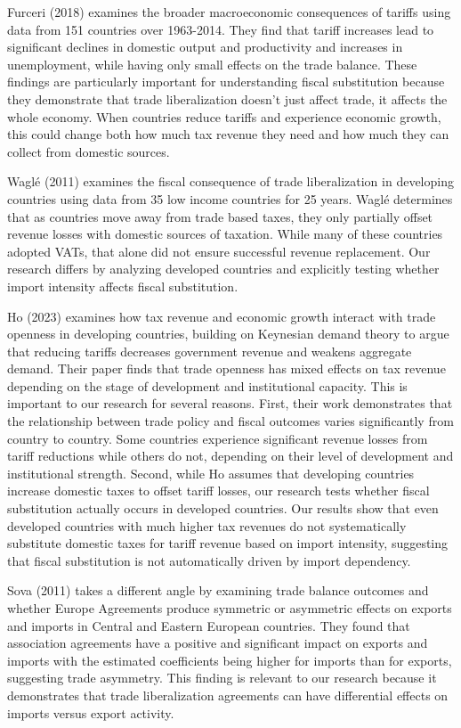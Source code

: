 \documentclass[12pt]{article}
\begin{document}
        Furceri (2018) examines the broader macroeconomic consequences of tariffs using data from 151 countries over 1963-2014. They find that tariff increases lead to significant declines in domestic output and productivity and increases in unemployment, while having only small effects on the trade balance. These findings are particularly important for understanding fiscal substitution because they demonstrate that trade liberalization doesn't just affect trade, it affects the whole economy. When countries reduce tariffs and experience economic growth, this could change both how much tax revenue they need and how much they can collect from domestic sources.   
        
        Waglé (2011) examines the fiscal consequence of trade liberalization in developing countries using data from 35 low income countries for 25 years. Waglé determines that  as countries move away from trade based taxes, they only partially offset revenue losses with domestic sources of taxation. While many of these countries adopted VATs, that alone did not ensure successful revenue replacement. Our research differs by analyzing developed countries and explicitly  testing whether import intensity affects fiscal substitution.
    
        Ho (2023) examines how tax revenue and economic growth interact with trade openness in developing countries, building on Keynesian demand theory to argue that reducing tariffs decreases government revenue and weakens aggregate demand. Their paper finds that trade openness has mixed effects on tax revenue depending on the stage of development and institutional capacity. This is important to our research for several reasons. First, their work demonstrates that the relationship between trade policy and fiscal outcomes varies significantly from country to country. Some countries experience significant revenue losses from tariff reductions while others do not, depending on their level of development and institutional strength. Second, while Ho assumes that developing countries increase domestic taxes to offset tariff losses, our research tests whether fiscal substitution actually occurs in developed countries. Our results show that even developed countries with much higher tax revenues do not systematically substitute domestic taxes for tariff revenue based on import intensity, suggesting that fiscal substitution is not automatically driven by import dependency.  

\setlength{\parindent}{20pt} Sova (2011) takes a different angle by examining trade balance outcomes and whether Europe Agreements produce symmetric or asymmetric effects on exports and imports in Central and Eastern European countries. They found that association agreements have a positive and significant impact on exports and imports with the estimated coefficients being higher for imports than for exports, suggesting trade asymmetry. This finding is relevant to our research because it demonstrates that trade liberalization agreements can have differential effects on imports versus export activity. 
\end{document}
